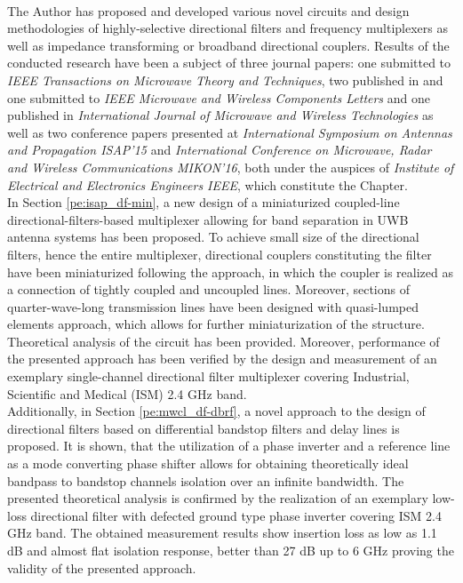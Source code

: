 \\
\indent The Author has proposed and developed various novel circuits and design methodologies of highly-selective directional filters and frequency multiplexers as well as impedance transforming or broadband directional couplers. Results of the conducted research have been a subject of three journal papers: one submitted to \textit{IEEE Transactions on Microwave Theory and Techniques}, two published in and one submitted to \textit{IEEE Microwave and Wireless Components Letters} and one published in \textit{International Journal of Microwave and Wireless Technologies} as well as two conference papers presented at \textit{International Symposium on Antennas and Propagation ISAP'15} and \textit{International Conference on Microwave, Radar and Wireless Communications MIKON'16}, both under the auspices of \textit{Institute of Electrical and Electronics Engineers IEEE}, which constitute the Chapter.
\\
\indent In Section \ref{pe:isap_df-min}, a new design of a miniaturized coupled-line directional-filters-based multiplexer allowing for band separation in UWB antenna systems has been proposed. To achieve small size of the directional filters, hence the entire multiplexer, directional couplers constituting the filter have been miniaturized following the   approach, in which the coupler is realized as a connection of tightly coupled and uncoupled lines. Moreover, sections of quarter-wave-long transmission lines have been designed with quasi-lumped elements approach, which allows for further miniaturization of the structure. Theoretical analysis of the circuit has been provided. Moreover, performance of the presented approach has been verified by the design and measurement of an exemplary single-channel directional filter multiplexer covering Industrial, Scientific and Medical (ISM) 2.4 GHz band.
\\
\indent Additionally, in Section \ref{pe:mwcl_df-dbrf}, a novel approach to the design of directional filters based on differential bandstop filters and delay lines is proposed. It is shown, that the utilization of a phase inverter and a reference line as a mode converting phase shifter allows for obtaining theoretically ideal bandpass to bandstop channels isolation over an infinite bandwidth. The presented theoretical analysis is confirmed by the realization of an exemplary low-loss directional filter with defected ground type phase inverter covering  ISM 2.4 GHz band. The obtained measurement results show insertion loss as low as 1.1 dB and almost flat isolation response, better than 27 dB up to 6 GHz proving the validity of the presented approach.
